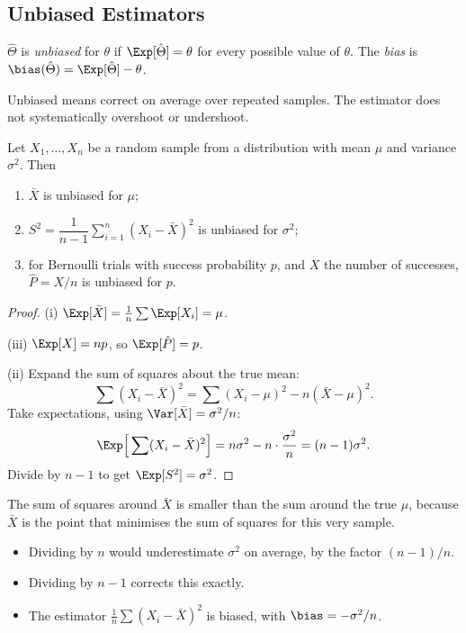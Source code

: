 \subsection{Unbiased Estimators}

\begin{definition}
$\hat\Theta$ is \emph{unbiased} for $\theta$ if $\Exp[\hat\Theta]=\theta$ for every possible value of $\theta$. The \emph{bias} is $\bias(\hat\Theta)=\Exp[\hat\Theta]-\theta$.
\end{definition}

Unbiased means correct on average over repeated samples. The estimator does not systematically overshoot or undershoot.

\begin{theorem}\label{thm:unbiased}
Let $X_1,\dots,X_n$ be a random sample from a distribution with mean $\mu$ and variance $\sigma^2$. Then
\begin{enumerate}[label=(\roman*)]
  \item $\bar{X}$ is unbiased for $\mu$;
  \item $S^2=\dfrac{1}{n-1}\sum_{i=1}^n(X_i-\bar{X})^2$ is unbiased for $\sigma^2$;
  \item for Bernoulli trials with success probability $p$, and $X$ the number of successes, $\hat{P}=X/n$ is unbiased for $p$.
\end{enumerate}
\end{theorem}

\begin{proof}
(i) $\Exp[\bar{X}]=\frac1n\sum\Exp[X_i]=\mu$.

(iii) $\Exp[X]=np$, so $\Exp[\hat{P}]=p$.

(ii) Expand the sum of squares about the true mean:
\[ \sum(X_i-\bar{X})^2=\sum(X_i-\mu)^2-n(\bar{X}-\mu)^2. \]
Take expectations, using $\Var[\bar{X}]=\sigma^2/n$:
\[ \Exp\Big[\sum(X_i-\bar{X})^2\Big]=n\sigma^2-n\cdot\frac{\sigma^2}n=(n-1)\sigma^2. \]
Divide by $n-1$ to get $\Exp[S^2]=\sigma^2$.
\end{proof}

\begin{intuition}
The sum of squares around $\bar{X}$ is smaller than the sum around the true $\mu$, because $\bar{X}$ is the point that minimises the sum of squares for this very sample.
\begin{itemize}
  \item Dividing by $n$ would underestimate $\sigma^2$ on average, by the factor $(n-1)/n$.
  \item Dividing by $n-1$ corrects this exactly.
  \item The estimator $\frac1n\sum(X_i-\bar{X})^2$ is biased, with $\bias=-\sigma^2/n$.
\end{itemize}
\end{intuition}

